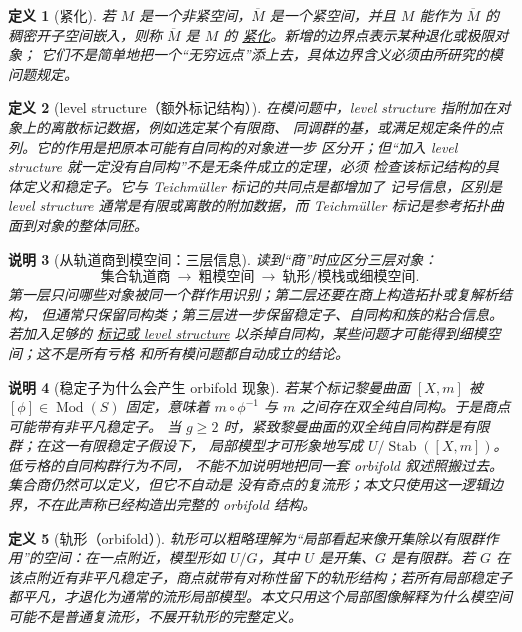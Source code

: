 \documentclass[UTF8,fontset=none,a4paper,11pt]{ctexart}
\theoremstyle{foundation-definition}
\newtheorem{definition}{定义}[section]
\theoremstyle{foundation-theorem}
\theoremstyle{foundation-proposition}
\theoremstyle{foundation-example}
\theoremstyle{foundation-remark}
\newtheorem{remark}[definition]{说明}
\theoremstyle{foundation-theorem}
\newcommand{\Mod}{\operatorname{Mod}}
\newcommand{\term}[2]{\hyperref[#1]{#2}}
\begin{document}
\begin{definition}[紧化]\label{def:compactification}
若 \(M\) 是一个非紧空间，\(\overline M\) 是一个紧空间，并且 \(M\) 能作为
\(\overline M\) 的稠密开子空间嵌入，则称 \(\overline M\) 是 \(M\) 的
\term{def:compactification}{紧化}。新增的边界点表示某种退化或极限对象；
它们不是简单地把一个“无穷远点”添上去，具体边界含义必须由所研究的模问题规定。
\end{definition}

\begin{definition}[level structure（额外标记结构）]\label{def:level-structure}
在模问题中，level structure 指附加在对象上的离散标记数据，例如选定某个有限商、
同调群的基，或满足规定条件的点列。它的作用是把原本可能有自同构的对象进一步
区分开；但“加入 level structure 就一定没有自同构”不是无条件成立的定理，必须
检查该标记结构的具体定义和稳定子。它与 Teichmüller 标记的共同点是都增加了
记号信息，区别是 level structure 通常是有限或离散的附加数据，而 Teichmüller
标记是参考拓扑曲面到对象的整体同胚。
\end{definition}

\begin{remark}[从轨道商到模空间：三层信息]
读到“商”时应区分三层对象：
\[
\text{集合轨道商}
\ \longrightarrow\
\text{粗模空间}
\ \longrightarrow\
\text{轨形/模栈或细模空间}.
\]
第一层只问哪些对象被同一个群作用识别；第二层还要在商上构造拓扑或复解析结构，
但通常只保留同构类；第三层进一步保留稳定子、自同构和族的粘合信息。若加入足够的
\term{def:level-structure}{标记或 level structure} 以杀掉自同构，某些问题才可能得到细模空间；这不是所有亏格
和所有模问题都自动成立的结论。
\end{remark}

\begin{remark}[稳定子为什么会产生 orbifold 现象]
若某个标记黎曼曲面 \([X,m]\) 被 \([\phi]\in\Mod(S)\) 固定，意味着
\(m\circ\phi^{-1}\) 与 \(m\) 之间存在双全纯自同构。于是商点可能带有非平凡稳定子。
当 \(g\geq2\) 时，紧致黎曼曲面的双全纯自同构群是有限群；在这一有限稳定子假设下，
局部模型才可形象地写成 \(U/\operatorname{Stab}([X,m])\)。低亏格的自同构群行为不同，
不能不加说明地把同一套 orbifold 叙述照搬过去。集合商仍然可以定义，但它不自动是
没有奇点的复流形；本文只使用这一逻辑边界，不在此声称已经构造出完整的 orbifold 结构。
\end{remark}

\begin{definition}[轨形（orbifold）]\label{def:orbifold}
轨形可以粗略理解为“局部看起来像开集除以有限群作用”的空间：在一点附近，模型形如 \(U/G\)，其中 \(U\) 是开集、\(G\) 是有限群。若 \(G\) 在该点附近有非平凡稳定子，商点就带有对称性留下的轨形结构；若所有局部稳定子都平凡，才退化为通常的流形局部模型。本文只用这个局部图像解释为什么模空间可能不是普通复流形，不展开轨形的完整定义。
\end{definition}
\end{document}
